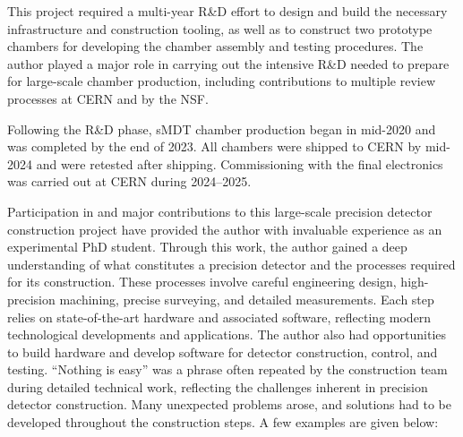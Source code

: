This project required a multi-year R\&D effort to design and build the necessary infrastructure and construction tooling, as well as to construct two prototype chambers for developing the chamber assembly and testing procedures. The author played a major role in carrying out the intensive R\&D needed to prepare for large-scale chamber production, including contributions to multiple review processes at CERN and by the NSF.

Following the R\&D phase, sMDT chamber production began in mid-2020 and was completed by the end of 2023. All chambers were shipped to CERN by mid-2024 and were retested after shipping. Commissioning with the final electronics was carried out at CERN during 2024--2025.

Participation in and major contributions to this large-scale precision detector construction project have provided the author with invaluable experience as an experimental PhD student. Through this work, the author gained a deep understanding of what constitutes a precision detector and the processes required for its construction. These processes involve careful engineering design, high-precision machining, precise surveying, and detailed measurements. Each step relies on state-of-the-art hardware and associated software, reflecting modern technological developments and applications. The author also had opportunities to build hardware and develop software for detector construction, control, and testing.
``Nothing is easy'' was a phrase often repeated by the construction team during detailed technical work, reflecting the challenges inherent in precision detector construction. Many unexpected problems arose, and solutions had to be developed throughout the construction steps. A few examples are given below:

